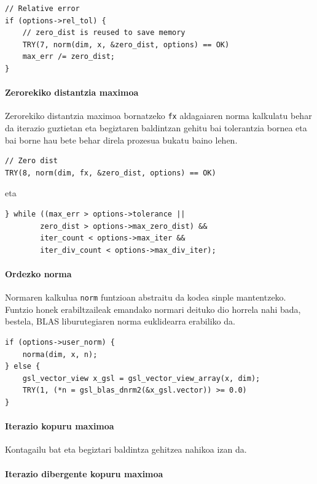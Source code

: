 \documentclass[10pt,a4paper,basque]{article}
\begin{document}
\begin{lstlisting}
// Relative error
if (options->rel_tol) {
	// zero_dist is reused to save memory
	TRY(7, norm(dim, x, &zero_dist, options) == OK)
	max_err /= zero_dist;
}
\end{lstlisting}

\paragraph{Zerorekiko distantzia maximoa}

Zerorekiko distantzia maximoa bornatzeko \verb|fx| aldagaiaren norma kalkulatu behar da iterazio guztietan eta begiztaren baldintzan gehitu bai tolerantzia bornea eta bai borne hau bete behar direla prozesua bukatu baino lehen.

\begin{lstlisting}
// Zero dist
TRY(8, norm(dim, fx, &zero_dist, options) == OK)
\end{lstlisting}

eta

\begin{lstlisting}
} while ((max_err > options->tolerance ||
		zero_dist > options->max_zero_dist) &&
		iter_count < options->max_iter &&
		iter_div_count < options->max_div_iter);
\end{lstlisting}

\paragraph{Ordezko norma}

Normaren kalkulua \verb|norm| funtzioan abstraitu da kodea sinple mantentzeko. Funtzio honek erabiltzaileak emandako normari deituko dio horrela nahi bada, bestela, BLAS liburutegiaren norma euklidearra erabiliko da.

\begin{lstlisting}
if (options->user_norm) {
	norma(dim, x, n);
} else {
	gsl_vector_view x_gsl = gsl_vector_view_array(x, dim);
	TRY(1, (*n = gsl_blas_dnrm2(&x_gsl.vector)) >= 0.0)
}
\end{lstlisting}

\paragraph{Iterazio kopuru maximoa}

Kontagailu bat eta begiztari baldintza gehitzea nahikoa izan da.

\paragraph{Iterazio dibergente kopuru maximoa}
\end{document}
